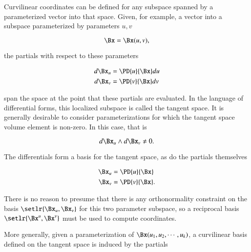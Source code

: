 %
%
Curvilinear coordinates can be defined for any subspace spanned by a parameterized vector into that space.
Given, for example, a vector into a subspace parameterized by parameters \(u,v\)

\begin{dmath}\label{eqn:curvilinear:20}
\Bx = \Bx(u, v),
\end{dmath}

the partials with respect to these parameters

\begin{dmath}\label{eqn:curvilinear:40}
\begin{aligned}
d\Bx_u &= \PD{u}{\Bx} du \\
d\Bx_v &= \PD{v}{\Bx} dv
\end{aligned}
\end{dmath}

span the space at the point that these partials are evaluated.
In the language of differential forms, this localized subspace is called the tangent space.
It is generally desirable to consider parameterizations for which the tangent space volume element is non-zero.
In this case, that is

\begin{dmath}\label{eqn:curvilinear:60}
d\Bx_u \wedge d\Bx_v \ne 0.
\end{dmath}

The differentials form a basis for the tangent space, as do the partials themselves

\begin{dmath}\label{eqn:curvilinear:80}
\begin{aligned}
\Bx_u &= \PD{u}{\Bx} \\
\Bx_v &= \PD{v}{\Bx}.
\end{aligned}
\end{dmath}

There is no reason to presume that there is any orthonormality constraint on the basis \( \setlr{ \Bx_u, \Bx_v } \) for this two parameter subspace, so a reciprocal basis \( \setlr{ \Bx^u, \Bx^v } \)
must be used to compute coordinates.

More generally, given a parameterization of \( \Bx(u_1, u_2, \cdots, u_k) \), a curvilinear basis defined on the tangent space is induced by the partials

